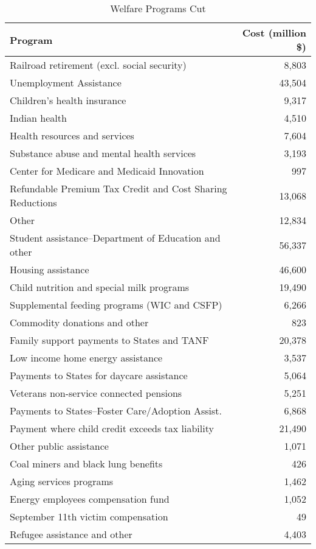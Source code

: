 \documentclass{article}
\begin{document}
\singlespacing
\begin{table}[H]
\caption{Welfare Programs Cut}
\begin{center}
\begin{adjustbox}{max width=\textwidth}
\begin{tabular}{lr}
\toprule
Program & Cost (million \$) \\
\midrule
Railroad retirement (excl. social security) & 8,803 \\
Unemployment Assistance & 43,504 \\
Children's health insurance & 9,317 \\
Indian health & 4,510 \\
Health resources and services & 7,604 \\
Substance abuse and mental health services & 3,193 \\
Center for Medicare and Medicaid Innovation & 997 \\
Refundable Premium Tax Credit and Cost Sharing Reductions & 13,068 \\
Other & 12,834 \\
Student assistance--Department of Education and other & 56,337 \\
Housing assistance & 46,600 \\
Child nutrition and special milk programs & 19,490 \\
Supplemental feeding programs (WIC and CSFP) & 6,266 \\
Commodity donations and other & 823 \\
Family support payments to States and TANF & 20,378 \\
Low income home energy assistance & 3,537 \\
Payments to States for daycare assistance & 5,064 \\
Veterans non-service connected pensions & 5,251 \\
Payments to States--Foster Care/Adoption Assist. & 6,868 \\
Payment where child credit exceeds tax liability & 21,490 \\
Other public assistance & 1,071 \\
Coal miners and black lung benefits & 426 \\
Aging services programs & 1,462 \\
Energy employees compensation fund & 1,052 \\
September 11th victim compensation & 49 \\
Refugee assistance and other & 4,403 \\

\end{tabular}
\end{adjustbox}
\end{center}
\end{table}
\end{document}
